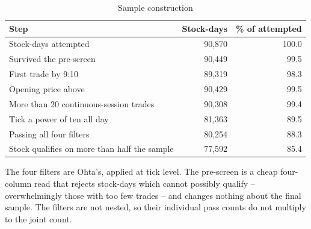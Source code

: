 \begin{table}[htbp]
\centering
\caption{Sample construction}
\label{tab:waterfall}
\small
\begin{threeparttable}
\begin{tabular}{@{}lrr@{}}
\toprule
Step & Stock-days & \% of attempted \\
\midrule
Stock-days attempted & 90,870 & 100.0 \\
Survived the pre-screen & 90,449 & 99.5 \\
First trade by 9:10 & 89,319 & 98.3 \\
Opening price above \textyen 200 & 90,429 & 99.5 \\
More than 20 continuous-session trades & 90,308 & 99.4 \\
Tick a power of ten all day & 81,363 & 89.5 \\
Passing all four filters & 80,254 & 88.3 \\
Stock qualifies on more than half the sample & 77,592 & 85.4 \\
\bottomrule
\end{tabular}
\begin{tablenotes}[flushleft]\footnotesize
\item The four filters are Ohta's, applied at tick level. The pre-screen is a cheap four-column read that rejects stock-days which cannot possibly qualify -- overwhelmingly those with too few trades -- and changes nothing about the final sample. The filters are not nested, so their individual pass counts do not multiply to the joint count.
\end{tablenotes}
\end{threeparttable}
\end{table}
